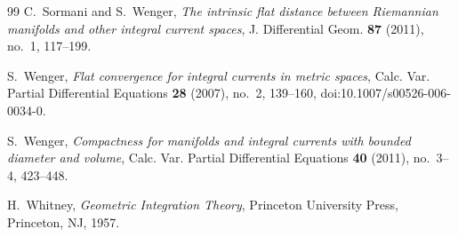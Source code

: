 \documentclass[11pt]{article}
\theoremstyle{remark}
\begin{document}
\begin{thebibliography}{99}
C.~Sormani and S.~Wenger,
\emph{The intrinsic flat distance between Riemannian manifolds and other integral current spaces},
J. Differential Geom. \textbf{87} (2011), no.~1, 117--199.

S.~Wenger,
\emph{Flat convergence for integral currents in metric spaces},
Calc. Var. Partial Differential Equations \textbf{28} (2007), no.~2, 139--160,
doi:10.1007/s00526-006-0034-0.

S.~Wenger,
\emph{Compactness for manifolds and integral currents with bounded diameter and volume},
Calc. Var. Partial Differential Equations \textbf{40} (2011), no.~3--4, 423--448.

H.~Whitney,
\emph{Geometric Integration Theory},
Princeton University Press, Princeton, NJ, 1957.

\end{thebibliography}
\end{document}
